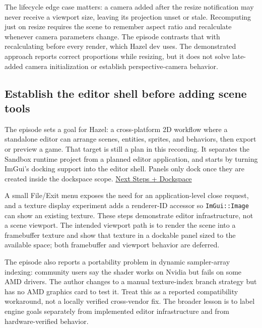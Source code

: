 The lifecycle edge case matters: a camera added after the resize notification may never receive a viewport size, leaving its projection unset or stale. Recomputing just on resize requires the scene to remember aspect ratio and recalculate whenever camera parameters change. The episode contrasts that with recalculating before every render, which Hazel dev uses. The demonstrated approach reports correct proportions while resizing, but it does not solve late-added camera initialization or establish perspective-camera behavior.

\subsection{Establish the editor shell before adding scene tools}\label{06-engine-ii-ch032-establish-the-editor-shell-before-adding-scene-tools}

\hypertarget{06-engine-ii-ch032-establish-the-editor-shell-before-adding-scene-tools}{}

The episode sets a goal for Hazel: a cross-platform 2D workflow where a standalone editor can arrange scenes, entities, sprites, and behaviors, then export or preview a game. That target is still a plan in this recording. It separates the Sandbox runtime project from a planned editor application, and starts by turning ImGui's docking support into the editor shell. Panels only dock once they are created inside the dockspace scope. \href{https://www.youtube.com/watch?v=UljMVrQ_zYY}{Next Steps + Dockspace}

A small File/Exit menu exposes the need for an application-level close request, and a texture display experiment adds a renderer-ID accessor so \texttt{ImGui::Image} can show an existing texture. These steps demonstrate editor infrastructure, not a scene viewport. The intended viewport path is to render the scene into a framebuffer texture and show that texture in a dockable panel sized to the available space; both framebuffer and viewport behavior are deferred.

The episode also reports a portability problem in dynamic sampler-array indexing: community users say the shader works on Nvidia but fails on some AMD drivers. The author changes to a manual texture-index branch strategy but has no AMD graphics card to test it. Treat this as a reported compatibility workaround, not a locally verified cross-vendor fix. The broader lesson is to label engine goals separately from implemented editor infrastructure and from hardware-verified behavior.

